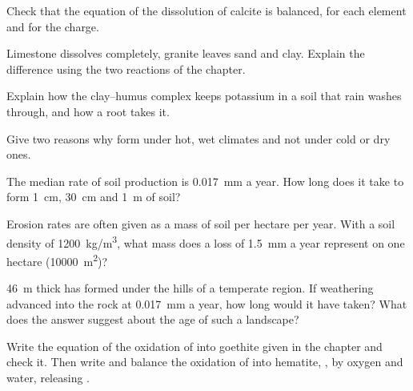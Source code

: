 \begin{exercise}[$\star\star$]\label{exo:g10:soil-formation:6}
Check that the equation of the dissolution of calcite is balanced, for each
element and for the charge.
\end{exercise}

\begin{exercise}[$\star\star$]\label{exo:g10:soil-formation:7}
Limestone dissolves completely, granite leaves sand and clay. Explain the
difference using the two reactions of the chapter.
\end{exercise}

\begin{exercise}[$\star\star$]\label{exo:g10:soil-formation:8}
Explain how the clay--humus complex keeps potassium in a soil that rain
washes through, and how a root takes it.
\end{exercise}

\begin{exercise}[$\star\star$]\label{exo:g10:soil-formation:9}
Give two reasons why  form under hot, wet climates and not under
cold or dry ones.
\end{exercise}

\begin{exercise}[$\star\star$]\label{exo:g10:soil-formation:10}
The median rate of soil production is \qty{0.017}{mm} a year. How long does
it take to form \qty{1}{cm}, \qty{30}{cm} and \qty{1}{m} of soil?
\end{exercise}

\begin{exercise}[$\star\star$]\label{exo:g10:soil-formation:11}
Erosion rates are often given as a mass of soil per hectare per year. With a
soil density of \qty{1200}{kg/m^3}, what mass does a loss of
\qty{1.5}{mm} a year represent on one hectare (\qty{10000}{m^2})?
\end{exercise}

\begin{exercise}[$\star\star\star$]\label{exo:g10:soil-formation:12}
 \qty{46}{m} thick has formed under the hills of a temperate region.
If weathering advanced into the rock at \qty{0.017}{mm} a year, how long would
it have taken? What does the answer suggest about the age of such a
landscape?
\end{exercise}

\begin{exercise}[$\star\star\star$]\label{exo:g10:soil-formation:13}
Write the equation of the oxidation of  into goethite given in the
chapter and check it. Then write and balance the oxidation of  into
hematite, , by oxygen and water, releasing .
\end{exercise}

